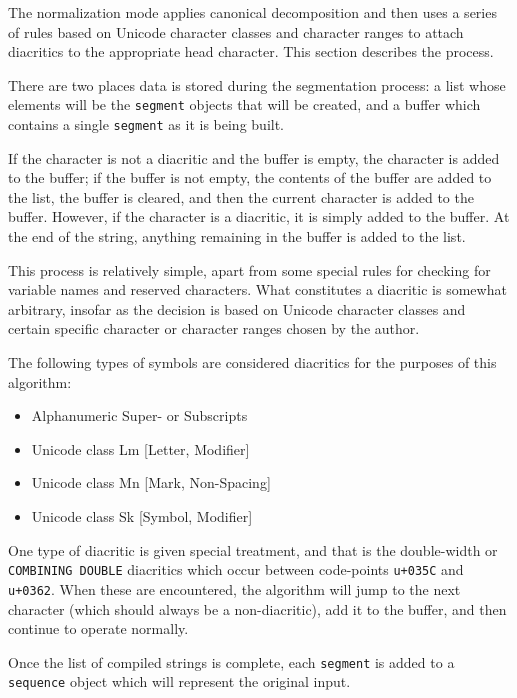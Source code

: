 \documentclass[10pt,letterpaper]{article}
\begin{document}
The normalization mode applies canonical decomposition and then uses a series of rules based on Unicode character classes and character ranges to attach diacritics to the appropriate head character. This section describes the process.

There are two places data is stored during the segmentation process: a list whose elements will be the \texttt{segment} objects that will be created, and a buffer which contains a single \texttt{segment} as it is being built.

If the character is not a diacritic and the buffer is empty, the character is added to the buffer; if the buffer is not empty, the contents of the buffer are added to the list, the buffer is cleared, and then the current character is added to the buffer. However, if the character is a diacritic, it is simply added to the buffer. At the end of the string, anything remaining in the buffer is added to the list.

This process is relatively simple, apart from some special rules for checking for variable names and reserved characters. What constitutes a diacritic is somewhat arbitrary, insofar as the decision is based on Unicode character classes and certain specific character or character ranges chosen by the author.

The following types of symbols are considered diacritics for the purposes of this algorithm:
\begin{itemize}
\itemsep1pt \parskip0pt  
\item Alphanumeric Super- or Subscripts
\item Unicode class Lm [Letter, Modifier]
\item Unicode class Mn [Mark, Non-Spacing]
\item Unicode class Sk [Symbol, Modifier]
\end{itemize}

One type of diacritic is given special treatment, and that is the double-width or \texttt{COMBINING DOUBLE} diacritics which occur between code-points \texttt{u+035C} and \texttt{u+0362}. When these are encountered, the algorithm will jump to the next character (which should always be a non-diacritic), add it to the buffer, and then continue to operate normally.

Once the list of compiled strings is complete, each \texttt{segment} is added to a \texttt{sequence} object which will represent the original input.
\end{document}
